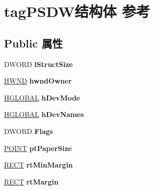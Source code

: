 \hypertarget{structtag_p_s_d_w}{}\section{tag\+P\+S\+D\+W结构体 参考}
\label{structtag_p_s_d_w}
\subsection*{Public 属性}
\begin{DoxyCompactItemize}
\item 
\mbox{\label{structtag_p_s_d_w_a5d3dfdd673d2d13d5afce0bd93a8fc8d}} 
D\+W\+O\+RD {\bfseries l\+Struct\+Size}
\item 
\mbox{\label{structtag_p_s_d_w_ab8a2da340b82ecec8d97158185d0f923}} 
\hyperlink{interfacevoid}{H\+W\+ND} {\bfseries hwnd\+Owner}
\item 
\mbox{\label{structtag_p_s_d_w_aedbda11261186166132f5370ad334060}} 
\hyperlink{interfacevoid}{H\+G\+L\+O\+B\+AL} {\bfseries h\+Dev\+Mode}
\item 
\mbox{\label{structtag_p_s_d_w_a20634108a104eec7005bebf9ba9d2c25}} 
\hyperlink{interfacevoid}{H\+G\+L\+O\+B\+AL} {\bfseries h\+Dev\+Names}
\item 
\mbox{\label{structtag_p_s_d_w_a9df56e31be8791b9dfdb81cb8c6fc018}} 
D\+W\+O\+RD {\bfseries Flags}
\item 
\mbox{\label{structtag_p_s_d_w_a49d0516720eb98bdb1ffe911aaf3b5c3}} 
\hyperlink{structtag_p_o_i_n_t}{P\+O\+I\+NT} {\bfseries pt\+Paper\+Size}
\item 
\mbox{\label{structtag_p_s_d_w_a371d2942815a90c189732e1fff4da03e}} 
\hyperlink{structtag_r_e_c_t}{R\+E\+CT} {\bfseries rt\+Min\+Margin}
\item 
\mbox{\label{structtag_p_s_d_w_a7fe6ccf1fd072ed944cd8f051171a42d}} 
\hyperlink{structtag_r_e_c_t}{R\+E\+CT} {\bfseries rt\+Margin}
\item 
\mbox{\label{structtag_p_s_d_w_a156cca78cde515560f7f0ecbb44b8530}} 

\end{DoxyCompactItemize}
